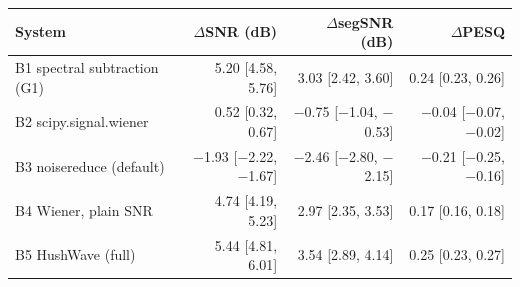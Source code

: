 \begin{tabular}{lrrr}
\toprule
System & $\Delta$SNR (dB) & $\Delta$segSNR (dB) & $\Delta$PESQ \\
\midrule
B1 spectral subtraction (G1) & 5.20 [4.58, 5.76] & 3.03 [2.42, 3.60] & 0.24 [0.23, 0.26] \\
B2 scipy.signal.wiener & 0.52 [0.32, 0.67] & $-$0.75 [$-$1.04, $-$0.53] & $-$0.04 [$-$0.07, $-$0.02] \\
B3 noisereduce (default) & $-$1.93 [$-$2.22, $-$1.67] & $-$2.46 [$-$2.80, $-$2.15] & $-$0.21 [$-$0.25, $-$0.16] \\
B4 Wiener, plain SNR & 4.74 [4.19, 5.23] & 2.97 [2.35, 3.53] & 0.17 [0.16, 0.18] \\
B5 HushWave (full) & 5.44 [4.81, 6.01] & 3.54 [2.89, 4.14] & 0.25 [0.23, 0.27] \\
\bottomrule
\end{tabular}
